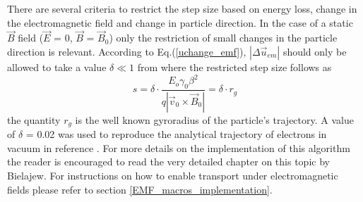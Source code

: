There are several criteria to restrict the step size based on energy loss, change
in the electromagnetic field and change in particle direction. In the case of a static
$\vec{B}$ field ($\vec{E}$ = 0, $\vec{B}$ = $\vec{B}_0$) only the restriction of small changes
in the particle direction is relevant. According to Eq.(\ref{uchange_emf}), $|\Delta\vec{u}_{em}|$
should only be allowed to take a value $\delta \ll 1$ from where the restricted step size follows as
\begin{equation}
\label{uchange_restriction}
  s = \delta \cdot \frac{E_o \gamma_0 \beta^2}{q\left|\vec{v}_0 \times \vec{B}_0\right|} = \delta \cdot r_g
\end{equation}
the quantity $r_g$ is the well known gyroradius of the particle's trajectory. A value of $\delta$ = 0.02
was used to reproduce the analytical trajectory of electrons in vacuum in reference \cite{Bi89a}.
For more details on the implementation of this algorithm the reader is encouraged to read the very detailed
chapter on this topic by Bielajew\cite{Bi89a}. For instructions on how to enable transport under electromagnetic
fields please refer to section \ref{EMF_macros_implementation}.

\newpage
